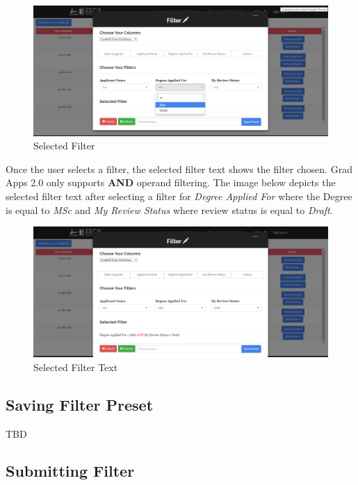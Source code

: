 \documentclass[fontsize=12pt,paper=letter,twoside]{scrartcl}
\begin{document}
\clearpage
\begin{figure}[!htb]
\begin{center}
\includegraphics[width=.9\textwidth]{images/selected_filter.png}
\end{center}
\caption{Selected Filter}
\label{fig:fm_selected_filter}
\end{figure}

\bigskip
\noindent Once the user selects a filter, the selected filter text shows the filter chosen. Grad Apps 2.0 only supports \textbf{AND} operand filtering. The image below depicts the selected filter text after selecting a filter for \emph{Degree Applied For} where the Degree is equal to \emph{MSc} and \emph{My Review Status} where review status is equal to \emph{Draft}.

\begin{figure}[!htb]
\begin{center}
\includegraphics[width=.9\textwidth]{images/selected_filter_text.png}
\end{center}
\caption{Selected Filter Text}
\label{fig:fm_selected_filter_txt}
\end{figure}

\subsection{Saving Filter Preset}

TBD

\subsection{Submitting Filter}
\end{document}
